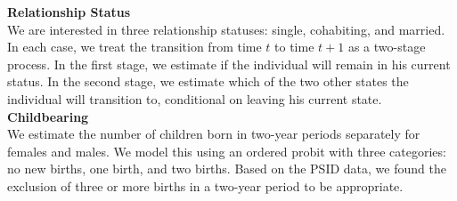 \noindent \textbf{Relationship Status}\\
\noindent We are interested in three relationship statuses: single, cohabiting, and married. In each case, we treat the transition
from time $t$ to time $t+1$ as a two-stage process. In the first stage, we estimate if the individual will remain in his
current status. In the second stage, we estimate which of the two other states the individual will transition to, conditional
on leaving his current state. \\

\noindent \textbf{Childbearing}\\
\noindent We estimate the number of children born in two-year periods separately for females and males. We model this using an ordered probit with
three categories: no new births, one birth, and two births. Based on the PSID data, we found the exclusion of three or more
births in a two-year period to be appropriate. \\
%
